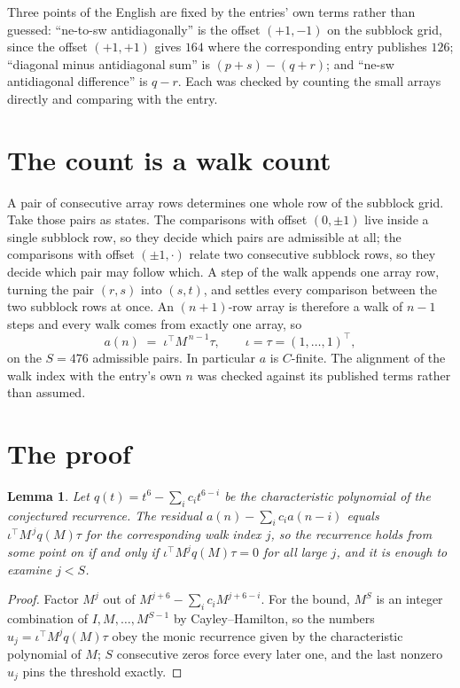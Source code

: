 \documentclass[11pt,a4paper]{article}
\theoremstyle{plain}
\newtheorem{lemma}[theorem]{Lemma}
\theoremstyle{definition}
\begin{document}
Three points of the English are fixed by the entries' own terms rather than guessed:
``ne-to-sw antidiagonally'' is the offset $(+1,-1)$ on the subblock grid, since the offset
$(+1,+1)$ gives $164$ where the corresponding entry publishes $126$; ``diagonal minus
antidiagonal sum'' is $(p+s)-(q+r)$; and ``ne-sw antidiagonal difference'' is $q-r$. Each was
checked by counting the small arrays directly and comparing with the entry.

\section{The count is a walk count}

A pair of consecutive array rows determines one whole row of the subblock grid. Take those
pairs as states. The comparisons with offset $(0,\pm1)$ live inside a single subblock row, so
they decide which pairs are admissible at all; the comparisons with offset $(\pm1,\cdot)$
relate two consecutive subblock rows, so they decide which pair may follow which. A step of the
walk appends one array row, turning the pair $(r,s)$ into $(s,t)$, and settles every comparison
between the two subblock rows at once. An $(n+1)$-row array is therefore a walk of $n-1$ steps
and every walk comes from exactly one array, so
\[
a(n)\;=\;\iota^{\!\top}M^{\,n-1}\tau,\qquad \iota=\tau=(1,\dots,1)^{\!\top},
\]
on the $S=476$ admissible pairs. In particular $a$ is $C$-finite. The alignment of the walk
index with the entry's own $n$ was checked against its published terms rather than assumed.

\section{The proof}

\begin{lemma}\label{lem:crit}
Let $q(t)=t^{6}-\sum_i c_it^{6-i}$ be the characteristic polynomial of the
conjectured recurrence. The residual $a(n)-\sum_ic_ia(n-i)$ equals
$\iota^{\!\top}M^{\,j}q(M)\tau$ for the corresponding walk index $j$, so the recurrence
holds from some point on if and only if $\iota^{\!\top}M^{j}q(M)\tau=0$ for all large $j$,
and it is enough to examine $j<S$.
\end{lemma}

\begin{proof}
Factor $M^{j}$ out of $M^{j+6}-\sum_ic_iM^{j+6-i}$. For the bound, $M^{S}$
is an integer combination of $I,M,\dots,M^{S-1}$ by Cayley--Hamilton, so the numbers
$u_j=\iota^{\!\top}M^{j}q(M)\tau$ obey the monic recurrence given by the characteristic
polynomial of $M$; $S$ consecutive zeros force every later one, and the last nonzero $u_j$
pins the threshold exactly.
\end{proof}
\end{document}

